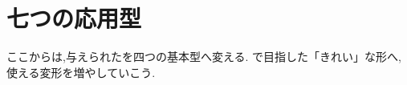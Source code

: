 
\section{七つの応用型}\label{節：応用7パターン}
  ここからは,与えられたを四つの基本型へ変える.
  で目指した「きれい」な形へ,使える変形を増やしていこう.








